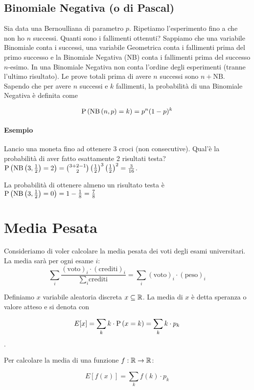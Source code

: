 \begin{enumerate}
\end{enumerate}

\subsection{Binomiale Negativa (o di Pascal)}
Sia data una Bernoulliana di parametro $ p $. Ripetiamo l'esperimento fino a che non ho $ n $ successi. Quanti sono i fallimenti ottenuti? Sappiamo che una variabile Binomiale conta i successi, una variabile Geometrica conta i fallimenti prima del primo successo e la Binomiale Negativa (NB) conta i fallimenti prima del successo $ n $-esimo. In una Binomiale Negativa non conta l'ordine degli esperimenti (tranne l'ultimo risultato). Le prove totali prima di avere $ n $ successi sono $ n+\text{NB} $. Sapendo che per avere $ n $ successi e $ k $ fallimenti, la probabilità di una Binomiale Negativa è definita come 

\[ \text{P}\left(\text{NB}\left(n, p\right) = k\right) = p^n(1-p)^k \] 

\paragraph{Esempio} 
Lancio una moneta fino ad ottenere 3 croci (non consecutive). Qual'è la probabilità di aver fatto esattamente 2 risultati testa? $ \text{P}\left(\text{NB}\left(3, \frac{1}{2}\right) = 2\right) = \binom{3+2-1}{2} \left(\frac{1}{2}\right)^3 \left(\frac{1}{2}\right)^2 = \frac{3}{16} $. 

La probabilità di ottenere almeno un risultato testa è $ \text{P}\left(\text{NB}\left(3, \frac{1}{2}\right) = 0\right) = 1 - \frac{1}{8} = \frac{7}{8} $

\section{Media Pesata}
Consideriamo di voler calcolare la media pesata dei voti degli esami universitari. La media sarà per ogni esame $ i $:
\[ \sum_{i} \dfrac{(\text{voto})_i \cdot (\text{crediti})_i }{\sum_{i} \text{crediti}} = \sum_{i} (\text{voto})_i \cdot (\text{peso})_i \]

Definiamo $ x $ variabile aleatoria discreta $ x \subseteq \mathbb{R} $. La media di $ x $ è detta speranza o valore atteso e si denota con

\[ E[x] = \sum_{k} k \cdot \text{P}\left(x = k\right) = \sum_{k} k \cdot p_k \].

Per calcolare la media di una funzione $ f : \mathbb{R} \to \mathbb{R} $:

\[ E[f(x)] = \sum_{k} f(k) \cdot p_k \]

